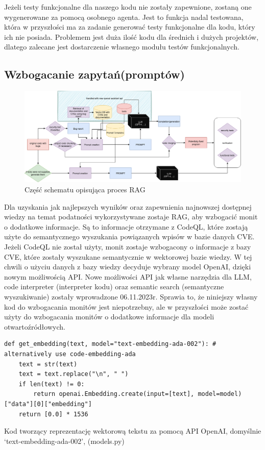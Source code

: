 Jeżeli testy funkcjonalne dla naszego kodu nie zostały zapewnione, zostaną one wygenerowane za pomocą osobnego agenta. 
Jest to funkcja nadal testowana, która w przyszłości ma za zadanie generować testy funkcjonalne dla kodu, który ich nie posiada. 
Problemem jest duża ilość kodu dla średnich i dużych projektów, dlatego zalecane jest dostarczenie własnego modułu testów funkcjonalnych.

\subsection{Wzbogacanie zapytań(promptów)}
\begin{figure}[h]
    \centering
    \includegraphics[clip, trim=3cm 11cm 3cm 0cm, width=0.9\linewidth]{img/gptester.drawio.png}
    \caption{Część schematu opisująca proces RAG}
    \label{fig:RAG-schemat}
\end{figure}

Dla uzyskania jak najlepszych wyników oraz zapewnienia najnowszej dostępnej wiedzy na temat podatności wykorzystywane zostaje RAG, aby wzbogacić monit o dodatkowe informacje. Są to informacje otrzymane z CodeQL, które zostają użyte do semantycznego wyszukania powiązanych wpisów w bazie danych CVE. 
Jeżeli CodeQL nie został użyty, monit zostaje wzbogacony o informacje z bazy CVE, które zostały wyszukane semantycznie w wektorowej bazie wiedzy. W tej chwili o użyciu danych z bazy wiedzy decyduje wybrany model OpenAI, dzięki nowym możliwością API. 
Nowe możliwości API jak własne narzędzia dla LLM, code interpreter (interpreter kodu) oraz semantic search (semantyczne wyszukiwanie) zostały wprowadzone 06.11.2023r.
Sprawia to, że niniejszy własny kod do wzbogacania monitów jest niepotrzebny, ale w przyszłości może zostać użyty do wzbogacania monitów o dodatkowe informacje dla modeli otwartoźródłowych. 
\begin{listing}
    \begin{verbatim}  
def get_embedding(text, model="text-embedding-ada-002"): # alternatively use code-embedding-ada
    text = str(text)
    text = text.replace("\n", " ")
    if len(text) != 0:
        return openai.Embedding.create(input=[text], model=model)["data"][0]["embedding"]
    return [0.0] * 1536

    \end{verbatim}
    \caption{Kod tworzący reprezentację wektorową tekstu za pomocą API OpenAI, domyślnie `text-embedding-ada-002', (models.py)} 
    \label{listing:vector_embedding}
\end{listing}
    
